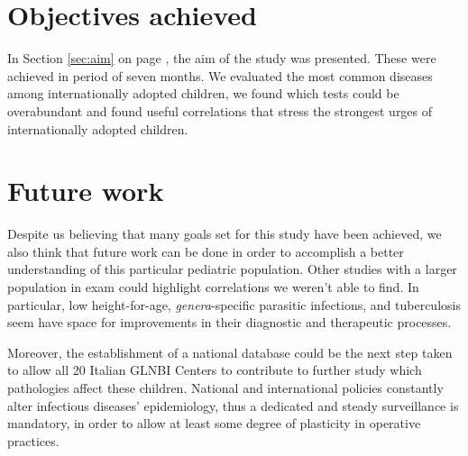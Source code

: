 \section{Objectives achieved}\label{secd:objectivesachieved}
In Section \ref{sec:aim} on page \pageref{sec:aim}, the aim of the study was presented. These were achieved in period of seven months. We evaluated the most common diseases among internationally adopted children, we found which tests could be overabundant and found useful correlations that stress the strongest urges of internationally adopted children.

\section{Future work}\label{sec:futurework}
Despite us believing that many goals set for this study have been achieved, we also think that future work can be done in order to accomplish a better understanding of this particular pediatric population. Other studies with a larger population in exam could highlight correlations we weren't able to find. In particular, low height-for-age, \textit{genera}-specific parasitic infections, and tuberculosis seem have space for improvements in their diagnostic and therapeutic processes.

Moreover, the establishment of a national database could be the next step taken to allow all 20 Italian GLNBI Centers to contribute to further study which pathologies affect these children. National and international policies constantly alter infectious diseases' epidemiology, thus a dedicated and steady surveillance is mandatory, in order to allow at least some degree of plasticity in operative practices.  